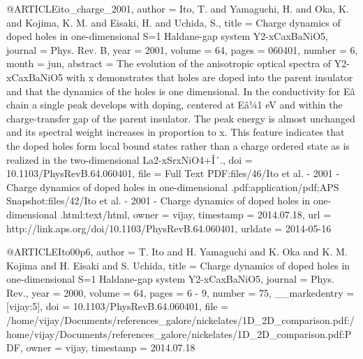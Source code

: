 @ARTICLE{ito_charge_2001,
  author = {Ito, T. and Yamaguchi, H. and Oka, K. and Kojima, K. M. and Eisaki,
	H. and Uchida, S.},
  title = {Charge dynamics of doped holes in one-dimensional S=1 Haldane-gap
	system Y2-{xCaxBaNiO5}},
  journal = {Phys. Rev. B},
  year = {2001},
  volume = {64},
  pages = {060401},
  number = {6},
  month = jun,
  abstract = {The evolution of the anisotropic optical spectra of Y2-{xCaxBaNiO5}
	with x demonstrates that holes are doped into the parent insulator
	and that the dynamics of the holes is one dimensional. In the conductivity
	for Eâ chain a single peak develops with doping, centered at Eâ¼1
	{eV} and within the charge-transfer gap of the parent insulator.
	The peak energy is almost unchanged and its spectral weight increases
	in proportion to x. This feature indicates that the doped holes form
	local bound states rather than a charge ordered state as is realized
	in the two-dimensional La2-{xSrxNiO4+Î´.}},
  doi = {10.1103/PhysRevB.64.060401},
  file = {Full Text PDF:files/46/Ito et al. - 2001 - Charge dynamics of doped holes in one-dimensional .pdf:application/pdf;APS Snapshot:files/42/Ito et al. - 2001 - Charge dynamics of doped holes in one-dimensional .html:text/html},
  owner = {vijay},
  timestamp = {2014.07.18},
  url = {http://link.aps.org/doi/10.1103/PhysRevB.64.060401},
  urldate = {2014-05-16}
}

@ARTICLE{Ito00p6,
  author = {T. Ito and H. Yamaguchi and K. Oka and K. M. Kojima and H. Eisaki
	and S. Uchida},
  title = {Charge dynamics of doped holes in one-dimensional S=1 Haldane-gap
	system Y2-xCaxBaNiO5},
  journal = {Phys. Rev.},
  year = {2000},
  volume = {64},
  pages = {6 - 9},
  number = {75},
  __markedentry = {[vijay:5]},
  doi = {10.1103/PhysRevB.64.060401},
  file = {/home/vijay/Documents/references_galore/nickelates/1D_2D_comparison.pdf:/home/vijay/Documents/references_galore/nickelates/1D_2D_comparison.pdf:PDF},
  owner = {vijay},
  timestamp = {2014.07.18}
}

